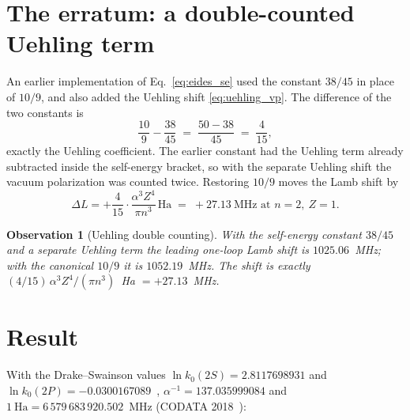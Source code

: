\documentclass[11pt]{article}
\newtheorem{observation}{Observation}
\begin{document}
\section{The erratum: a double-counted Uehling term}
\label{sec:eides}

An earlier implementation of Eq.~\eqref{eq:eides_se} used the constant
$38/45$ in place of $10/9$, and also added the Uehling shift
\eqref{eq:uehling_vp}.  The difference of the two constants is
\begin{equation}
\label{eq:ls1_constant_difference}
\frac{10}{9} - \frac{38}{45} \;=\; \frac{50 - 38}{45} \;=\; \frac{4}{15},
\end{equation}
exactly the Uehling coefficient.  The earlier constant had the Uehling
term already subtracted inside the self-energy bracket, so with the
separate Uehling shift the vacuum polarization was counted twice.
Restoring $10/9$ moves the Lamb shift by
\begin{equation}
\label{eq:shift_value}
\Delta L = +\frac{4}{15} \cdot \frac{\alpha^3 Z^4}{\pi n^3}\,\mathrm{Ha}
\;=\; +27.13~\text{MHz at } n = 2,\ Z = 1.
\end{equation}

\begin{observation}[Uehling double counting]
\label{obs:uehling_double}
With the self-energy constant $38/45$ and a separate Uehling term the
leading one-loop Lamb shift is $1025.06$~MHz; with the canonical
$10/9$ it is $1052.19$~MHz.  The shift is exactly
$(4/15)\,\alpha^3 Z^4/(\pi n^3)$~Ha $= +27.13$~MHz.
\end{observation}

\section{Result}
\label{sec:result}

With the Drake--Swainson values $\ln k_0(2S) = 2.8117698931$ and
$\ln k_0(2P) = -0.0300167089$~\cite{drake_swainson}, $\alpha^{-1} =
137.035999084$ and $1~\mathrm{Ha} = 6\,579\,683\,920.502$~MHz
(CODATA 2018~\cite{codata2018}):
\end{document}
